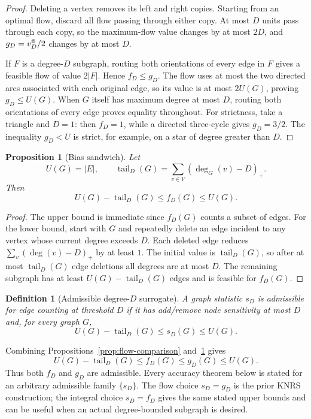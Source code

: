 \documentclass[11pt]{article}
\newtheorem{proposition}[theorem]{Proposition}
\newtheorem{definition}[theorem]{Definition}
\newcommand{\tail}{\operatorname{tail}}
\begin{document}
\begin{proof}
Deleting a vertex removes its left and right copies. Starting from an optimal flow, discard all flow passing through either copy. At most \(D\) units pass through each copy, so the maximum-flow value changes by at most \(2D\), and \(g_D=v_D^{\rm fl}/2\) changes by at most \(D\).

If \(F\) is a degree-\(D\) subgraph, routing both orientations of every edge in \(F\) gives a feasible flow of value \(2|F|\). Hence \(f_D\le g_D\). The flow uses at most the two directed arcs associated with each original edge, so its value is at most \(2U(G)\), proving \(g_D\le U(G)\). When \(G\) itself has maximum degree at most \(D\), routing both orientations of every edge proves equality throughout. For strictness, take a triangle and \(D=1\): then \(f_D=1\), while a directed three-cycle gives \(g_D=3/2\). The inequality \(g_D<U\) is strict, for example, on a star of degree greater than \(D\).
\end{proof}

\begin{proposition}[Bias sandwich]
\label{prop:bias-sandwich}
Let
\[
U(G)=|E|,\qquad
\tail_D(G)=\sum_{v\in V}(\deg_G(v)-D)_+.
\]
Then
\[
U(G)-\tail_D(G)\le f_D(G)\le U(G).
\]
\end{proposition}

\begin{proof}
The upper bound is immediate since \(f_D(G)\) counts a subset of edges. For the lower bound, start with \(G\) and repeatedly delete an edge incident to any vertex whose current degree exceeds \(D\). Each deleted edge reduces \(\sum_v(\deg(v)-D)_+\) by at least \(1\). The initial value is \(\tail_D(G)\), so after at most \(\tail_D(G)\) edge deletions all degrees are at most \(D\). The remaining subgraph has at least \(U(G)-\tail_D(G)\) edges and is feasible for \(f_D(G)\).
\end{proof}

\begin{definition}[Admissible degree-\(D\) surrogate]
\label{def:admissible-surrogate}
A graph statistic \(s_D\) is admissible for edge counting at threshold \(D\) if it has add/remove node sensitivity at most \(D\) and, for every graph \(G\),
\[
U(G)-\tail_D(G)\le s_D(G)\le U(G).
\]
\end{definition}

Combining Propositions~\ref{prop:flow-comparison} and~\ref{prop:bias-sandwich} gives
\[
U(G)-\tail_D(G)\le f_D(G)\le g_D(G)\le U(G).
\]
Thus both \(f_D\) and \(g_D\) are admissible. Every accuracy theorem below is stated for an arbitrary admissible family \(\{s_D\}\). The flow choice \(s_D=g_D\) is the prior KNRS construction; the integral choice \(s_D=f_D\) gives the same stated upper bounds and can be useful when an actual degree-bounded subgraph is desired.
\end{document}
